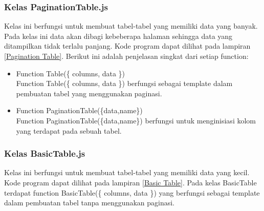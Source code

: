 \subsubsection{Kelas PaginationTable.js}
Kelas ini berfungsi untuk membuat tabel-tabel yang memiliki data yang banyak. Pada kelas ini data akan dibagi kebeberapa halaman sehingga data yang ditampilkan tidak terlalu panjang. Kode program dapat dilihat pada lampiran \ref{Pagination Table}. Berikut ini adalah penjelasan singkat dari setiap function:
\begin{itemize}
	\item Function Table(\{ columns, data \})\\
	Function Table(\{ columns, data \}) berfungsi sebagai template dalam pembuatan tabel yang menggunakan paginasi.
	\item Function PaginationTable(\{data,name\})\\
	Function PaginationTable(\{data,name\}) berfungsi untuk menginisiasi kolom yang terdapat pada sebuah tabel.
\end{itemize}
\subsubsection{Kelas BasicTable.js}
Kelas ini berfungsi untuk membuat tabel-tabel yang memiliki data yang kecil. Kode program dapat dilihat pada lampiran \ref{Basic Table}. Pada kelas BasicTable terdapat function BasicTable(\{ columns, data \}) yang berfungsi sebagai template dalam pembuatan tabel tanpa menggunakan paginasi.



